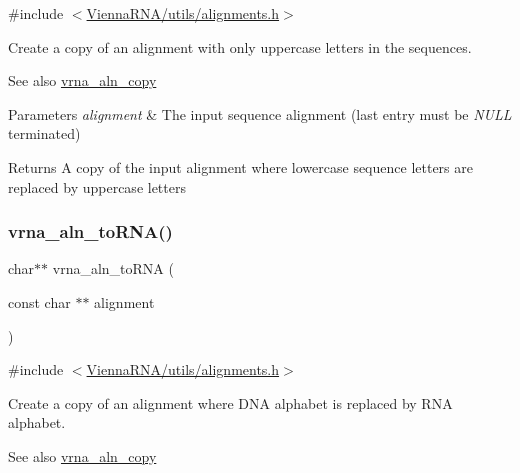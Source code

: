 {\ttfamily \#include $<$\mbox{\hyperlink{utils_2alignments_8h}{Vienna\+R\+N\+A/utils/alignments.\+h}}$>$}



Create a copy of an alignment with only uppercase letters in the sequences. 

\begin{DoxySeeAlso}{See also}
\mbox{\hyperlink{group__aln__utils_ga08cdca592461436860daf9738279ce17}{vrna\+\_\+aln\+\_\+copy}}
\end{DoxySeeAlso}

\begin{DoxyParams}{Parameters}
{\em alignment} & The input sequence alignment (last entry must be {\itshape N\+U\+LL} terminated) \\
\hline
\end{DoxyParams}
\begin{DoxyReturn}{Returns}
A copy of the input alignment where lowercase sequence letters are replaced by uppercase letters 
\end{DoxyReturn}
\mbox{\label{group__aln__utils_ga7886fc678553c06472a712a335cde9cf}} 
\subsubsection{\texorpdfstring{vrna\_aln\_toRNA()}{vrna\_aln\_toRNA()}}
{\footnotesize\ttfamily char$\ast$$\ast$ vrna\+\_\+aln\+\_\+to\+R\+NA (\begin{DoxyParamCaption}\item[{const char $\ast$$\ast$}]{alignment }\end{DoxyParamCaption})}



{\ttfamily \#include $<$\mbox{\hyperlink{utils_2alignments_8h}{Vienna\+R\+N\+A/utils/alignments.\+h}}$>$}



Create a copy of an alignment where D\+NA alphabet is replaced by R\+NA alphabet. 

\begin{DoxySeeAlso}{See also}
\mbox{\hyperlink{group__aln__utils_ga08cdca592461436860daf9738279ce17}{vrna\+\_\+aln\+\_\+copy}}
\end{DoxySeeAlso}

